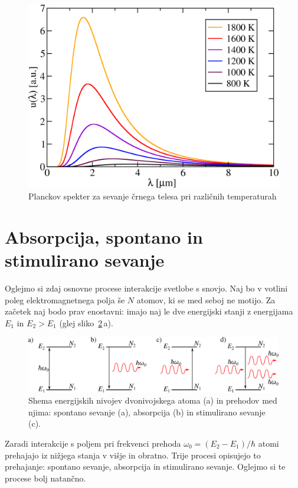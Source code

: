 \begin{figure}[h]
\centering
\includegraphics[width=7truecm]{slike/05_Planck.png}
\caption{Planckov spekter za sevanje črnega telesa pri različnih temperaturah}
\label{fig:Planck}
\end{figure}


\section{Absorpcija, spontano in stimulirano sevanje}

Oglejmo si zdaj osnovne procese interakcije svetlobe s snovjo. Naj
bo v votlini poleg elektromagnetnega polja še $N$ atomov, ki se med
seboj ne motijo. Za začetek naj bodo prav enostavni: 
imajo naj le dve energijski stanji z energijama $E_{1}$ in $E_{2}>E_1$ (glej sliko~\ref{sl4.1}\,a).\\
\begin{figure}[h]
\centering
\includegraphics[width=14truecm]{slike/05_Dvonivojski.png}
\caption{Shema energijskih nivojev dvonivojskega atoma (a) in prehodov med njima:
spontano sevanje (a), absorpcija (b) in stimulirano sevanje (c).}
\label{sl4.1}
\end{figure}


Zaradi interakcije s poljem pri frekvenci prehoda $\omega_{0}=(E_{2}-E_{1})/\hbar$
atomi prehajajo iz nižjega stanja v višje in obratno. Trije procesi opisujejo to 
prehajanje: spontano sevanje, absorpcija in stimulirano sevanje. Oglejmo si te procese
bolj natančno.

